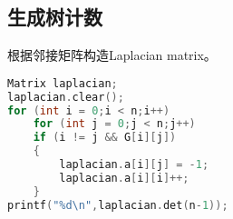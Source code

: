 \subsection{生成树计数}
	根据邻接矩阵构造Laplacian matrix。
	\begin{lstlisting}[language=c++]
Matrix laplacian;
laplacian.clear();
for (int i = 0;i < n;i++)
	for (int j = 0;j < n;j++)
	if (i != j && G[i][j])
	{
		laplacian.a[i][j] = -1;
		laplacian.a[i][i]++;
	}
printf("%d\n",laplacian.det(n-1));
	\end{lstlisting}
